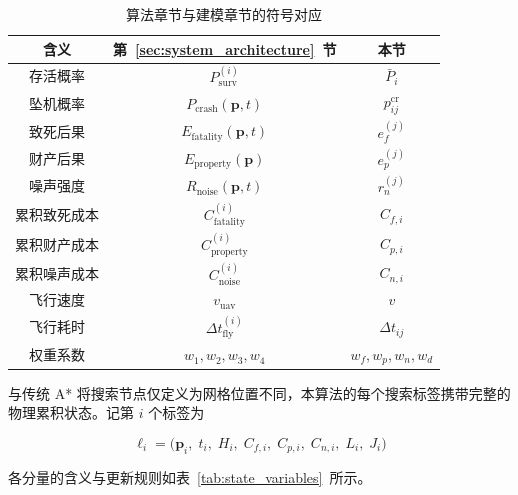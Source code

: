 \begin{table}[htbp]
\centering
\caption{算法章节与建模章节的符号对应}
\label{tab:symbol_mapping}
\renewcommand{\arraystretch}{1.25}
\begin{tabular}{c c c}
\toprule
含义 & 第~\ref{sec:system_architecture}~节 & 本节 \\
\midrule
存活概率 & $P_{\mathrm{surv}}^{(i)}$ & $\bar{P}_i$ \\
坠机概率 & $P_{\mathrm{crash}}(\mathbf{p},t)$ & $p_{ij}^{\mathrm{cr}}$ \\
致死后果 & $E_{\mathrm{fatality}}(\mathbf{p},t)$ & $e_f^{(j)}$ \\
财产后果 & $E_{\mathrm{property}}(\mathbf{p})$ & $e_p^{(j)}$ \\
噪声强度 & $R_{\mathrm{noise}}(\mathbf{p},t)$ & $r_n^{(j)}$ \\
累积致死成本 & $C_{\mathrm{fatality}}^{(i)}$ & $C_{f,i}$ \\
累积财产成本 & $C_{\mathrm{property}}^{(i)}$ & $C_{p,i}$ \\
累积噪声成本 & $C_{\mathrm{noise}}^{(i)}$ & $C_{n,i}$ \\
飞行速度 & $v_{\mathrm{uav}}$ & $v$ \\
飞行耗时 & $\Delta t_{\mathrm{fly}}^{(i)}$ & $\Delta t_{ij}$ \\
权重系数 & $w_1, w_2, w_3, w_4$ & $w_f, w_p, w_n, w_d$ \\
\bottomrule
\end{tabular}
\end{table}

与传统 A* 将搜索节点仅定义为网格位置不同，本算法的每个搜索标签携带完整的物理累积状态。记第 $i$ 个标签为

\begin{equation}
\ell_i = \bigl(\mathbf{p}_i,\; t_i,\; H_i,\; C_{f,i},\; C_{p,i},\; C_{n,i},\; L_i,\; J_i\bigr)
\label{eq:label_state}
\end{equation}

各分量的含义与更新规则如表~\ref{tab:state_variables}~所示。

